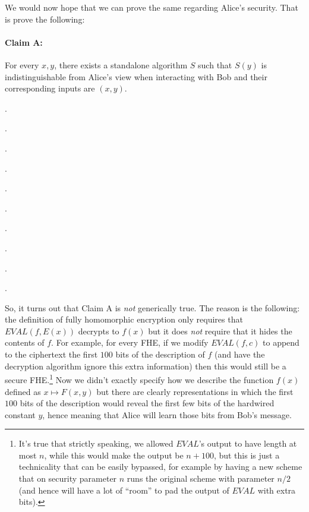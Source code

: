 We would now hope that we can prove the same regarding Alice's security.
That is prove the following:

\paragraph{Claim A:} For every \(x,y\), there exists a standalone
algorithm \(S\) such that \(S(y)\) is indistinguishable from Alice's
view when interacting with Bob and their corresponding inputs are
\((x,y)\).


.

.

.

.

.

.

.

.

.

.

\newpage

So, it turns out that Claim A is \emph{not} generically true. The reason
is the following: the definition of fully homomorphic encryption only
requires that \(\ensuremath{\mathit{EVAL}}(f,E(x))\) decrypts to
\(f(x)\) but it does \emph{not} require that it hides the contents of
\(f\). For example, for every FHE, if we modify
\(\ensuremath{\mathit{EVAL}}(f,c)\) to append to the ciphertext the
first \(100\) bits of the description of \(f\) (and have the decryption
algorithm ignore this extra information) then this would still be a
secure FHE.\footnote{It's true that strictly speaking, we allowed
  \(\ensuremath{\mathit{EVAL}}\)'s output to have length at most \(n\),
  while this would make the output be \(n+100\), but this is just a
  technicality that can be easily bypassed, for example by having a new
  scheme that on security parameter \(n\) runs the original scheme with
  parameter \(n/2\) (and hence will have a lot of ``room'' to pad the
  output of \(\ensuremath{\mathit{EVAL}}\) with extra bits).} Now we
didn't exactly specify how we describe the function \(f(x)\) defined as
\(x \mapsto F(x,y)\) but there are clearly representations in which the
first \(100\) bits of the description would reveal the first few bits of
the hardwired constant \(y\), hence meaning that Alice will learn those
bits from Bob's message.


